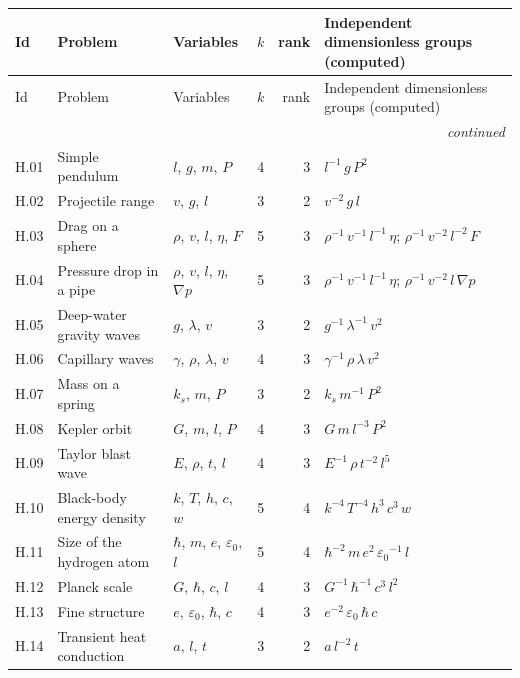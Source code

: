 {\scriptsize\setlength{\tabcolsep}{3pt}
\begin{longtable}{@{}l>{\raggedright\arraybackslash}p{3.0cm}>{\raggedright\arraybackslash}p{3.6cm}rr>{\raggedright\arraybackslash}p{6.2cm}@{}}
\toprule
Id & Problem & Variables & $k$ & rank & Independent dimensionless groups (computed) \\
\midrule\endfirsthead
\toprule
Id & Problem & Variables & $k$ & rank & Independent dimensionless groups (computed) \\
\midrule\endhead
\midrule\multicolumn{6}{r}{\emph{continued}}\\\endfoot
\bottomrule\endlastfoot
H.01 & Simple pendulum & $l$, $g$, $m$, $P$ & 4 & 3 & ${l}^{-1}\,g\,{P}^{2}$ \\
H.02 & Projectile range & $v$, $g$, $l$ & 3 & 2 & ${v}^{-2}\,g\,l$ \\
H.03 & Drag on a sphere & $\rho$, $v$, $l$, $\eta$, $F$ & 5 & 3 & ${\rho}^{-1}\,{v}^{-1}\,{l}^{-1}\,\eta$; ${\rho}^{-1}\,{v}^{-2}\,{l}^{-2}\,F$ \\
H.04 & Pressure drop in a pipe & $\rho$, $v$, $l$, $\eta$, $\nabla p$ & 5 & 3 & ${\rho}^{-1}\,{v}^{-1}\,{l}^{-1}\,\eta$; ${\rho}^{-1}\,{v}^{-2}\,l\,\nabla p$ \\
H.05 & Deep-water gravity waves & $g$, $\lambda$, $v$ & 3 & 2 & ${g}^{-1}\,{\lambda}^{-1}\,{v}^{2}$ \\
H.06 & Capillary waves & $\gamma$, $\rho$, $\lambda$, $v$ & 4 & 3 & ${\gamma}^{-1}\,\rho\,\lambda\,{v}^{2}$ \\
H.07 & Mass on a spring & $k_s$, $m$, $P$ & 3 & 2 & $k_s\,{m}^{-1}\,{P}^{2}$ \\
H.08 & Kepler orbit & $G$, $m$, $l$, $P$ & 4 & 3 & $G\,m\,{l}^{-3}\,{P}^{2}$ \\
H.09 & Taylor blast wave & $E$, $\rho$, $t$, $l$ & 4 & 3 & ${E}^{-1}\,\rho\,{t}^{-2}\,{l}^{5}$ \\
H.10 & Black-body energy density & $k$, $T$, $h$, $c$, $w$ & 5 & 4 & ${k}^{-4}\,{T}^{-4}\,{h}^{3}\,{c}^{3}\,w$ \\
H.11 & Size of the hydrogen atom & $\hbar$, $m$, $e$, $\varepsilon_0$, $l$ & 5 & 4 & ${\hbar}^{-2}\,m\,{e}^{2}\,{\varepsilon_0}^{-1}\,l$ \\
H.12 & Planck scale & $G$, $\hbar$, $c$, $l$ & 4 & 3 & ${G}^{-1}\,{\hbar}^{-1}\,{c}^{3}\,{l}^{2}$ \\
H.13 & Fine structure & $e$, $\varepsilon_0$, $\hbar$, $c$ & 4 & 3 & ${e}^{-2}\,\varepsilon_0\,\hbar\,c$ \\
H.14 & Transient heat conduction & $a$, $l$, $t$ & 3 & 2 & $a\,{l}^{-2}\,t$ \\

\end{longtable}}
